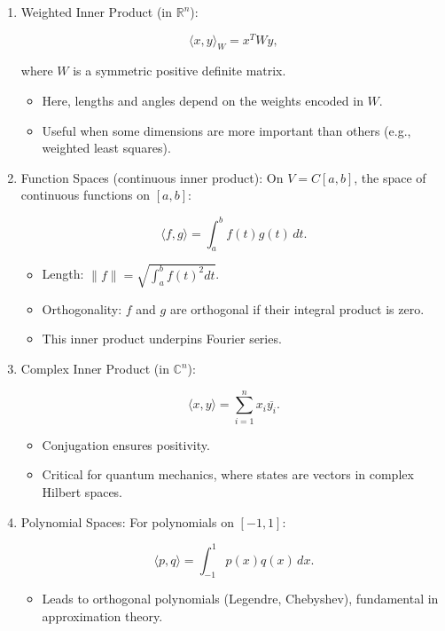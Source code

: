 \documentclass[
  letterpaper,
  DIV=11,
  numbers=noendperiod]{scrreprt}
\providecommand{\tightlist}{%
  \setlength{\itemsep}{0pt}\setlength{\parskip}{0pt}}
\begin{document}
\begin{enumerate}
\def\labelenumi{\arabic{enumi}.}
\item
  Weighted Inner Product (in \(\mathbb{R}^n\)):

  \[
  \langle x, y \rangle_W = x^T W y,
  \]

  where \(W\) is a symmetric positive definite matrix.

  \begin{itemize}
  \tightlist
  \item
    Here, lengths and angles depend on the weights encoded in \(W\).
  \item
    Useful when some dimensions are more important than others (e.g.,
    weighted least squares).
  \end{itemize}
\item
  Function Spaces (continuous inner product): On \(V = C[a,b]\), the
  space of continuous functions on \([a,b]\):

  \[
  \langle f, g \rangle = \int_a^b f(t) g(t) \, dt.
  \]

  \begin{itemize}
  \tightlist
  \item
    Length: \(\|f\| = \sqrt{\int_a^b f(t)^2 dt}\).
  \item
    Orthogonality: \(f\) and \(g\) are orthogonal if their integral
    product is zero.
  \item
    This inner product underpins Fourier series.
  \end{itemize}
\item
  Complex Inner Product (in \(\mathbb{C}^n\)):

  \[
  \langle x, y \rangle = \sum_{i=1}^n x_i \overline{y_i}.
  \]

  \begin{itemize}
  \tightlist
  \item
    Conjugation ensures positivity.
  \item
    Critical for quantum mechanics, where states are vectors in complex
    Hilbert spaces.
  \end{itemize}
\item
  Polynomial Spaces: For polynomials on \([-1,1]\):

  \[
  \langle p, q \rangle = \int_{-1}^1 p(x) q(x) \, dx.
  \]

  \begin{itemize}
  \tightlist
  \item
    Leads to orthogonal polynomials (Legendre, Chebyshev), fundamental
    in approximation theory.
  \end{itemize}
\end{enumerate}
\end{document}
